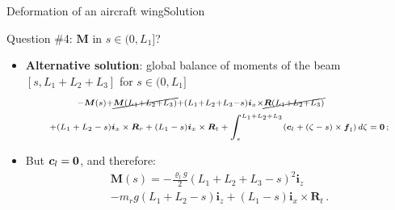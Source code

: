 \documentclass{beamer}
\newcommand{\id}{d}
\newcommand{\cj}{c}
\newcommand{\cv}{{\boldsymbol\cj}}
\newcommand{\xj}{x}
\newcommand{\zj}{z}
\renewcommand{\ij}{i}
\newcommand{\iv}{{\boldsymbol\ij}}
\newcommand{\fj}{f}
\newcommand{\fv}{{\boldsymbol\fj}}
\newcommand{\roi}{\varrho}
\newcommand{\Fresj}{R}
\newcommand{\Mresj}{M}
\newcommand{\Fres}{{\boldsymbol\Fresj}}
\newcommand{\Mres}{{\boldsymbol\Mresj}}
\newcommand{\bzero}{{\bf 0}}
\begin{document}
\begin{frame}{Deformation of an aircraft wing}{Solution}
\begin{overprint}
\vskip-20pt
\begin{exampleblock}{Question \#4: $\Mres$ in $s\in(0,L_1]$?}
\begin{itemize}
\item {\bf Alternative solution}: global balance of moments of the beam $[s,L_1+L_2+L_3]$ for $s\in(0,L_1]$
\begin{multline*}
\scriptstyle\!\!\!\!\!\!\!\!\!\!\!\!\!\!\!\!\!\!\!\!\!\!\!\! -\Mres(s)+\cancel{\Mres(L_1+L_2+L_3)}+(L_1+L_2+L_3-s)\iv_\xj\times\cancel{\Fres(L_1+L_2+L_3)}  \\
\scriptsize +(L_1+L_2-s)\iv_\xj\times\Fres_r +(L_1-s)\iv_\xj\times\Fres_t + \int_s^{L_1+L_2+L_3}(\cv_l+(\zeta-s)\times\fv_l)\,\id\zeta=\bzero\,;
\end{multline*}
\item But $\cv_l=\bzero$, and therefore:
\begin{multline*}
\Mres(s)=-\frac{\roi_l g}{2}(L_1+L_2+L_3-s)^2\iv_\zj\\
- m_r g(L_1+L_2-s)\iv_\zj + (L_1-s)\iv_\xj\times\Fres_t \,.
\end{multline*}
\end{itemize}
\end{exampleblock}

\end{overprint}

\end{frame}

%
%

\end{document}
